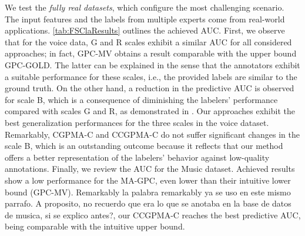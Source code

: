 \documentclass[journal]{IEEEtran}
\newcommand{\comment}[2]{{\color{blue}#1} {\color{red}#2}}
\begin{document}
We test the \emph{fully real datasets}, which configure the most
challenging scenario. The input features and the labels from multiple
experts come from real-world applications. \cref{tab:FSClaResults}
outlines the achieved AUC. First, we observe that for the voice data,
G and R scales exhibit a similar AUC for all considered approaches; in
fact, GPC-MV obtains a result comparable with the upper bound
GPC-GOLD. The latter can be explained in the sense that the annotators
exhibit a suitable performance for these scales, i.e., the provided
labels are similar to the ground truth. On the other hand, a reduction
in the predictive AUC is observed for scale B, which is a consequence
of diminishing the labelers' performance compared with scales G and R,
as demonstrated in \cite{gonzalez2015automatic}. Our approaches
exhibit the best generalization performances for the three scales in
the voice dataset. Remarkably, CGPMA-C and CCGPMA-C do not suffer
significant changes in the scale B, which is an outstanding outcome
because it reflects that our method offers a better representation of
the labelers' behavior against low-quality annotations. Finally, we
review the AUC for the Music dataset. Achieved results show a low
performance for the MA-GPC, even lower than their intuitive lower
bound (GPC-MV). \comment{Remarkably}{la palabra remarkably ya se uso
  en este mismo parrafo. A proposito, no recuerdo que era lo que se
  anotaba en la base de datos de musica, si se explico antes?}, our CCGPMA-C reaches the best predictive
AUC, being comparable with the intuitive upper bound.
\end{document}
